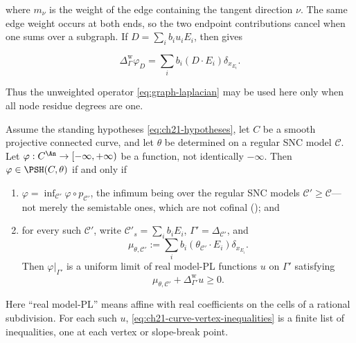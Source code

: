 where $m_\nu$ is the weight of the edge containing the tangent direction
$\nu$.  The same edge weight occurs at both ends, so the two endpoint
contributions cancel when one sums over a subgraph.  If
$D=\sum_i b_iu_iE_i$, then
 gives

\begin{equation}
\label{eq:ch21-weighted-model-measure}
 \Delta^{\mathrm w}_{\Gamma}\varphi_D
 =\sum_i b_i(D\cdot E_i)\delta_{x_{E_i}}.
\end{equation}

Thus the unweighted operator \eqref{eq:graph-laplacian} may be used here
only when all node residue degrees are one.

\begin{proposition}
\label{prop:ch21-curve-criterion}
Assume the standing hypotheses \eqref{eq:ch21-hypotheses}, let $C$ be a
smooth projective connected curve, and let $\theta$ be determined on a
regular SNC model $\mathcal C$.  Let
$\varphi:C^{\An}\to[-\infty,+\infty)$ be a function, not identically
$-\infty$.  Then $\varphi\in\PSH(C,\theta)$ if and only if
\begin{enumerate}
\item\label{itm:ch21-cc:inf}
$\varphi=\inf_{\mathcal C'}\varphi\circ p_{\mathcal C'}$, the infimum
being over the regular SNC models $\mathcal C'\geq\mathcal C$---not
merely the semistable ones, which are not cofinal
(); and
\item\label{itm:ch21-cc:pl}
for every such $\mathcal C'$, write
$\mathcal C'_s=\sum_i b_iE_i$, $\Gamma'=\Delta_{\mathcal C'}$, and
\begin{equation}
\label{eq:ch21-curve-reference-measure}
 \mu_{\theta,\mathcal C'}
 :=\sum_i b_i(\theta_{\mathcal C'}\cdot E_i)\delta_{x_{E_i}}.
\end{equation}
Then $\varphi|_{\Gamma'}$ is a uniform limit of real model-PL functions
$u$ on $\Gamma'$ satisfying
\begin{equation}
\label{eq:ch21-curve-vertex-inequalities}
 \mu_{\theta,\mathcal C'}+\Delta^{\mathrm w}_{\Gamma'}u\geq0.
\end{equation}
\end{enumerate}
Here ``real model-PL'' means affine with real coefficients on the cells of a
rational subdivision.  For each such $u$,
\eqref{eq:ch21-curve-vertex-inequalities} is a finite list of inequalities,
one at each vertex or slope-break point.
\end{proposition}


